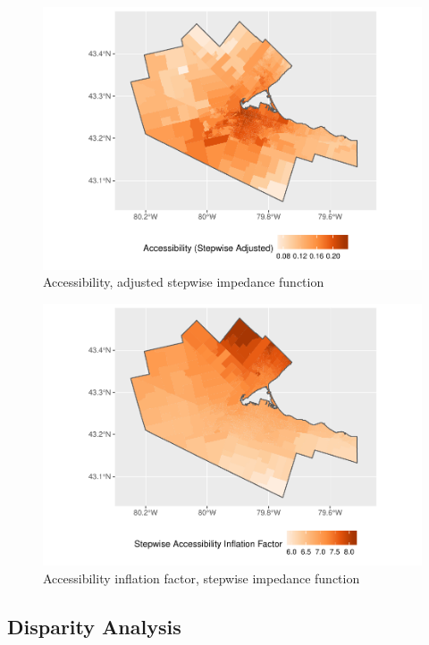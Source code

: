 \documentclass[10pt,letterpaper]{article}
\begin{document}
\begin{figure}
\includegraphics[width=0.95\linewidth]{Supply_and_Demand_Inflation_in_FCA_Methods_v2.1_files/figure-latex/fig19-map-accessibility-stepwise-adjusted-1} \caption{\label{fig:fig19-map-accessibility-stepwise-adjusted}Accessibility, adjusted stepwise impedance function}\label{fig:fig19-map-accessibility-stepwise-adjusted}
\end{figure}

\begin{figure}
\centering
\includegraphics{Supply_and_Demand_Inflation_in_FCA_Methods_v2.1_files/figure-latex/fig20-map-accessibility-stepwise-comparison-1.pdf}
\caption{\label{fig:fig20-map-accessibility-stepwise-comparison}Accessibility
inflation factor, stepwise impedance function}
\end{figure}

\subsection{Disparity Analysis}\label{disparity-analysis}
\end{document}
